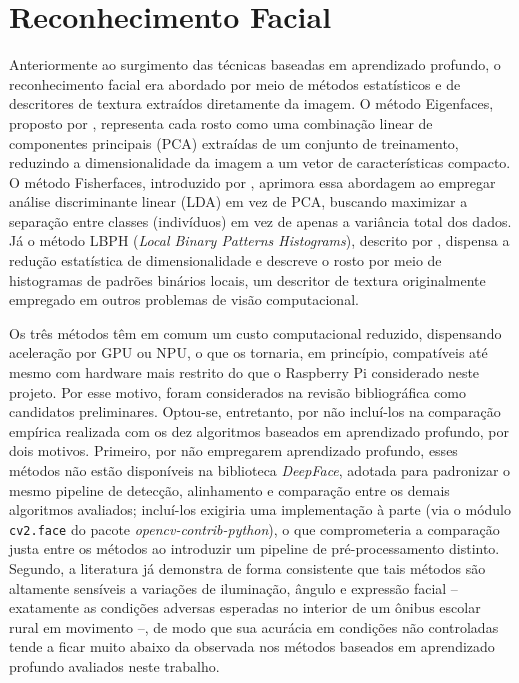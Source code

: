 \documentclass[
    12pt,
    openright,
    twoside,
    a4paper,
    chapter=TITLE,
    section=TITLE,
    english,
    brazil
    ]{abntex2}
\begin{document}
\section{Reconhecimento Facial}

Anteriormente ao surgimento das técnicas baseadas em aprendizado profundo, o
reconhecimento facial era abordado por meio de métodos estatísticos e de
descritores de textura extraídos diretamente da imagem. O método Eigenfaces,
proposto por , representa cada rosto como uma
combinação linear de componentes principais (PCA) extraídas de um conjunto de
treinamento, reduzindo a dimensionalidade da imagem a um vetor de
características compacto. O método Fisherfaces, introduzido por
, aprimora essa abordagem ao empregar
análise discriminante linear (LDA) em vez de PCA, buscando maximizar a
separação entre classes (indivíduos) em vez de apenas a variância total dos
dados. Já o método LBPH (\textit{Local Binary Patterns Histograms}), descrito
por , dispensa a redução estatística de
dimensionalidade e descreve o rosto por meio de histogramas de padrões
binários locais, um descritor de textura originalmente empregado em outros
problemas de visão computacional.

Os três métodos têm em comum um custo computacional reduzido, dispensando
aceleração por GPU ou NPU, o que os tornaria, em princípio, compatíveis até
mesmo com hardware mais restrito do que o Raspberry Pi considerado neste
projeto. Por esse motivo, foram considerados na revisão bibliográfica como
candidatos preliminares. Optou-se, entretanto, por não incluí-los na
comparação empírica realizada com os dez algoritmos baseados em aprendizado
profundo, por dois motivos. Primeiro, por não empregarem aprendizado
profundo, esses métodos não estão disponíveis na biblioteca \textit{DeepFace},
adotada para padronizar o mesmo pipeline de detecção, alinhamento e
comparação entre os demais algoritmos avaliados; incluí-los exigiria uma
implementação à parte (via o módulo \texttt{cv2.face} do pacote
\textit{opencv-contrib-python}), o que comprometeria a comparação justa entre
os métodos ao introduzir um pipeline de pré-processamento distinto. Segundo,
a literatura já demonstra de forma consistente que tais métodos são
altamente sensíveis a variações de iluminação, ângulo e expressão facial --
exatamente as condições adversas esperadas no interior de um ônibus escolar
rural em movimento --, de modo que sua acurácia em condições não controladas
tende a ficar muito abaixo da observada nos métodos baseados em aprendizado
profundo avaliados neste trabalho.
\end{document}

